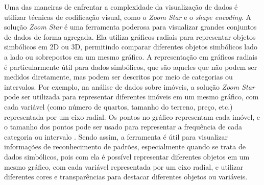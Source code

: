 Uma das maneiras de enfrentar a complexidade da visualização de dados é utilizar técnicas de codificação visual, como o \textit{Zoom Star} e o \textit{shape encoding}. A solução \textit{Zoom Star} é uma ferramenta poderosa para visualizar grandes conjuntos de dados de forma agregada. Ela utiliza gráficos radiais para representar objetos simbólicos em 2D ou 3D, permitindo comparar diferentes objetos simbólicos lado a lado ou sobrepostos em um mesmo gráfico. A representação em gráficos radiais é particularmente útil para dados simbólicos, que são aqueles que não podem ser medidos diretamente, mas podem ser descritos por meio de categorias ou intervalos. Por exemplo, na análise de dados sobre imóveis, a solução \textit{Zoom Star} pode ser utilizada para representar diferentes imóveis em um mesmo gráfico, com cada variável (como número de quartos, tamanho do terreno, preço, etc.) representada por um eixo radial. Os pontos no gráfico representam cada imóvel, e o tamanho dos pontos pode ser usado para representar a frequência de cada categoria ou intervalo \cite{zoomstar}. Sendo assim, a ferramenta é útil para visualizar informações de reconhecimento de padrões, especialmente quando se trata de dados simbólicos, pois com ela é possível representar diferentes objetos em um mesmo gráfico, com cada variável representada por um eixo radial, e utilizar diferentes cores e transparências para destacar diferentes objetos ou variáveis.

